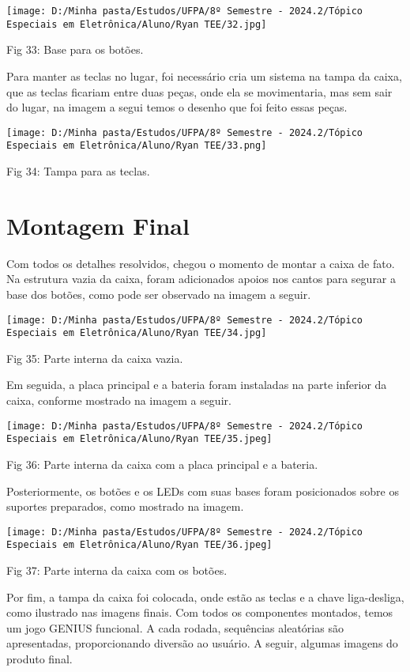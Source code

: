 \documentclass[
]{book}
\begin{document}
\texttt{[image: D:/Minha pasta/Estudos/UFPA/8º Semestre - 2024.2/Tópico Especiais em Eletrônica/Aluno/Ryan TEE/32.jpg]}

Fig 33: Base para os botões.

Para manter as teclas no lugar, foi necessário cria um sistema na tampa da caixa, que as teclas ficariam entre duas peças, onde ela se movimentaria, mas sem sair do lugar, na imagem a segui temos o desenho que foi feito essas peças.

\texttt{[image: D:/Minha pasta/Estudos/UFPA/8º Semestre - 2024.2/Tópico Especiais em Eletrônica/Aluno/Ryan TEE/33.png]}

Fig 34: Tampa para as teclas.

\section{Montagem Final}\label{montagem-final}

Com todos os detalhes resolvidos, chegou o momento de montar a caixa de fato. Na estrutura vazia da caixa, foram adicionados apoios nos cantos para segurar a base dos botões, como pode ser observado na imagem a seguir.

\texttt{[image: D:/Minha pasta/Estudos/UFPA/8º Semestre - 2024.2/Tópico Especiais em Eletrônica/Aluno/Ryan TEE/34.jpg]}

Fig 35: Parte interna da caixa vazia.

Em seguida, a placa principal e a bateria foram instaladas na parte inferior da caixa, conforme mostrado na imagem a seguir.

\texttt{[image: D:/Minha pasta/Estudos/UFPA/8º Semestre - 2024.2/Tópico Especiais em Eletrônica/Aluno/Ryan TEE/35.jpeg]}

Fig 36: Parte interna da caixa com a placa principal e a bateria.

Posteriormente, os botões e os LEDs com suas bases foram posicionados sobre os suportes preparados, como mostrado na imagem.

\texttt{[image: D:/Minha pasta/Estudos/UFPA/8º Semestre - 2024.2/Tópico Especiais em Eletrônica/Aluno/Ryan TEE/36.jpeg]}

Fig 37: Parte interna da caixa com os botões.

Por fim, a tampa da caixa foi colocada, onde estão as teclas e a chave liga-desliga, como ilustrado nas imagens finais. Com todos os componentes montados, temos um jogo GENIUS funcional. A cada rodada, sequências aleatórias são apresentadas, proporcionando diversão ao usuário. A seguir, algumas imagens do produto final.
\end{document}
